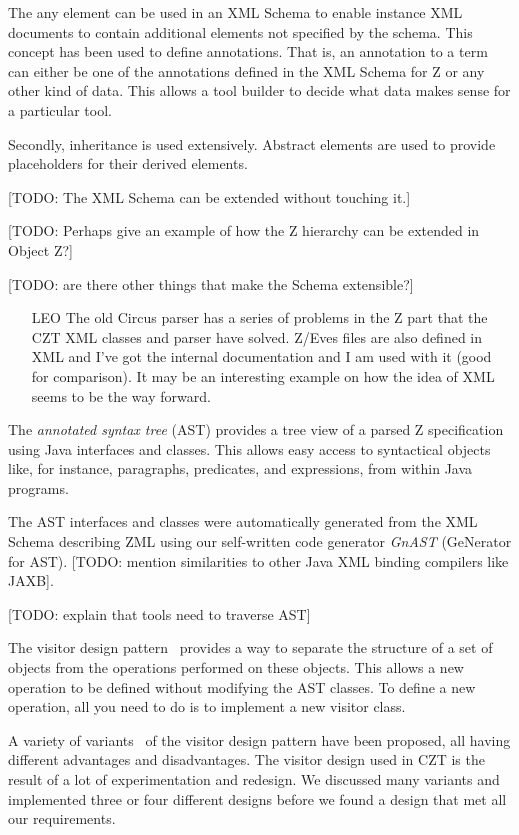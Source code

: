 \documentclass{llncs}
\begin{document}
  The any element can be used in an XML Schema to enable instance XML
  documents to contain additional elements not specified by the
  schema.  This concept has been used to define annotations.  That is,
  an annotation to a term can either be one of the annotations defined
  in the XML Schema for Z or any other kind of data.  This allows a
  tool builder to decide what data makes sense for a particular tool.

  Secondly, inheritance is used extensively.  Abstract elements are
  used to provide placeholders for their derived elements.

  [TODO: The XML Schema can be extended without touching it.]

  [TODO: Perhaps give an example of how the Z hierarchy can be
  extended in Object Z?]

  [TODO: are there other things that make the Schema extensible?]

  \begin{itemize}
    \item[LEO] The old Circus parser has a series of problems in the Z
      part that the CZT XML classes and parser have solved.  Z/Eves
      files are also defined in XML and I've got the internal
      documentation and I am used with it (good for comparison).  It
      may be an interesting example on how the idea of XML seems to be
      the way forward.
  \end{itemize}

 The \emph{annotated syntax tree} (AST) provides a tree view of a
  parsed Z specification using Java interfaces and classes.  This
  allows easy access to syntactical objects like, for instance,
  paragraphs, predicates, and expressions, from within Java programs.

  The AST interfaces and classes were automatically generated from the
  XML Schema describing ZML using our self-written code generator
  \emph{GnAST} (GeNerator for AST). [TODO: mention similarities to
  other Java XML binding compilers like JAXB].

  [TODO: explain that tools need to traverse AST]

  The visitor design pattern~\cite{GamEA:95} provides a way to
  separate the structure of a set of objects from the operations
  performed on these objects.  This allows a new operation to be
  defined without modifying the AST classes.  To define a new
  operation, all you need to do is to implement a new visitor class.

  A variety of variants~\cite{MaiCha:01} of the visitor design pattern
  have been proposed, all having different advantages and
  disadvantages.  The visitor design used in CZT is the result of a
  lot of experimentation and redesign.  We discussed many variants and
  implemented three or four different designs before we found a design
  that met all our requirements.
\end{document}
